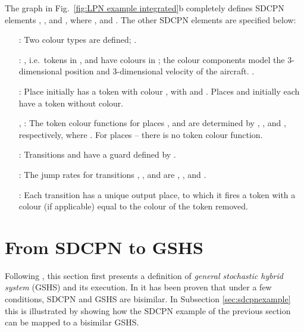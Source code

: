 \documentclass[copyright,creativecommons]{eptcs}
\begin{document}
The graph in Fig.\ \ref{fig:LPN example integrated}b completely
defines SDCPN elements , ,  and
, where ,  and . The other SDCPN elements are specified below:
\begin{itemize}
\item[:] Two colour types are defined; .

\item[:] , i.e.\
                   tokens in ,  and  have colours in ;
                   the colour components model the 3-dimensional position
                   and 3-dimensional velocity of the aircraft. .

\item[:] Place  initially has a token with colour
, with 
                   and .
                   Places  and  initially each have a token without
                   colour.

\item[,] : The token colour functions for
places ,  and
                    are determined by
                   ,
                   , and
                   , respectively, where
                   .
                   For places  --  there is no token colour function.

\item[:] Transitions  and  have a guard
                   defined by .

\item[:] The jump rates for transitions , ,
 and
                    are ,
                   ,  and .

\item[:] Each transition has a unique output place, to
which it
                   fires a token with a colour (if applicable) equal to the
                   colour of the token removed.

\end{itemize}




\section{From SDCPN to GSHS}\label{sec:gshsautomaton}

Following \cite{BujorianuLygeros2006}, this section first presents a
definition of \emph{general stochastic hybrid system} (GSHS) and
its execution. In \cite{EverdijBlom2006} it has been proven that
under a few conditions, SDCPN and GSHS are bisimilar. In
Subsection \ref{sec:sdcpnexample} this is illustrated
by showing how the SDCPN example of the previous section can be
mapped to a bisimilar GSHS.
\end{document}
